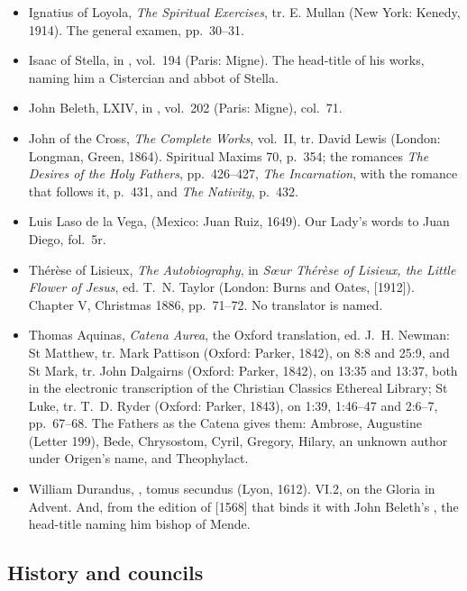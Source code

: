 \begin{itemize}[leftmargin=1.3em, itemsep=0.3em]
(Paris: Garnier, 1895), col.~797.
\item Ignatius of Loyola, \textit{The Spiritual Exercises}, tr. E. Mullan (New York: Kenedy, 1914).
The general examen, pp.~30--31.
\item Isaac of Stella, in , vol.~194 (Paris: Migne). The head-title of
his works, naming him a Cistercian and abbot of Stella.
\item John Beleth,  LXIV, in ,
vol.~202 (Paris: Migne), col.~71.
\item John of the Cross, \textit{The Complete Works}, vol.~II, tr. David Lewis (London: Longman,
Green, 1864). Spiritual Maxims 70, p.~354; the romances \textit{The Desires of the Holy Fathers},
pp.~426--427, \textit{The Incarnation}, with the romance that follows it, p.~431, and
\textit{The Nativity}, p.~432.
\item Luis Laso de la Vega,  (Mexico: Juan Ruiz, 1649). Our Lady's
words to Juan Diego, fol.~5r.
\item Thérèse of Lisieux, \textit{The Autobiography}, in \textit{Sœur Thérèse of Lisieux, the
Little Flower of Jesus}, ed. T.~N. Taylor (London: Burns and Oates, [1912]). Chapter V,
Christmas 1886, pp.~71--72. No translator is named.
\item Thomas Aquinas, \textit{Catena Aurea}, the Oxford translation, ed. J.~H. Newman: St Matthew,
tr. Mark Pattison (Oxford: Parker, 1842), on 8:8 and 25:9, and St Mark, tr. John Dalgairns
(Oxford: Parker, 1842), on 13:35 and 13:37, both in the electronic transcription of the Christian
Classics Ethereal Library; St Luke, tr. T.~D. Ryder (Oxford: Parker, 1843), on 1:39, 1:46--47
and 2:6--7, pp.~67--68. The Fathers as the Catena gives them: Ambrose, Augustine (Letter 199),
Bede, Chrysostom, Cyril, Gregory, Hilary, an unknown author under Origen's name, and Theophylact.
\item William Durandus, , tomus secundus (Lyon, 1612).
VI.2, on the Gloria in Advent. And, from the edition of [1568] that binds it with John Beleth's
, the head-title naming him bishop of Mende.
\end{itemize}

\subsection{History and councils}

